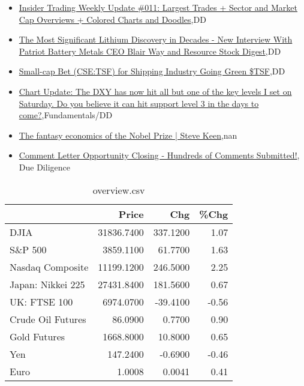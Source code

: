 \documentclass{article}%
\begin{document}
%
\begin{itemize}%
\item%
\href{https://reddit.com/r/wallstreetbets/comments/ydxvmz/insider\_trading\_weekly\_update\_011\_largest\_trades/}{Insider Trading Weekly Update \#011: Largest Trades + Sector and Market Cap Overviews + Colored Charts and Doodles},DD%
\item%
\href{https://reddit.com/r/Baystreetbets/comments/yducwl/the\_most\_significant\_lithium\_discovery\_in\_decades/}{The Most Significant Lithium Discovery in Decades - New Interview With Patriot Battery Metals CEO Blair Way and Resource Stock Digest},DD%
\item%
\href{https://reddit.com/r/Baystreetbets/comments/yd7ajq/smallcap\_bet\_csetsf\_for\_shipping\_industry\_going/}{Small-cap Bet (CSE:TSF) for Shipping Industry Going Green \$TSF},DD%
\item%
\href{https://reddit.com/r/StockMarket/comments/ydxb5z/chart\_update\_the\_dxy\_has\_now\_hit\_all\_but\_one\_of/}{Chart Update: The DXY has now hit all but one of the key levels I set on Saturday. Do you believe it can hit support level 3 in the days to come?},Fundamentals/DD%
\item%
\href{https://reddit.com/r/Economics/comments/ydu8n4/the\_fantasy\_economics\_of\_the\_nobel\_prize\_steve/}{The fantasy economics of the Nobel Prize | Steve Keen},nan%
\item%
\href{https://reddit.com/r/Superstonk/comments/ydxvkl/comment\_letter\_opportunity\_closing\_hundreds\_of/}{Comment Letter Opportunity Closing - Hundreds of Comments Submitted!}, Due Diligence%
\end{itemize}%


\begin{table}[htbp]%
\caption{overview.csv}%
\centering%
\begin{adjustbox}{width=1\textwidth}%
\begin{tabular}{lrrr}
\toprule
                  &      Price &      Chg &  \%Chg \\
\midrule
             DJIA & 31836.7400 & 337.1200 &  1.07 \\
          S\&P 500 &  3859.1100 &  61.7700 &  1.63 \\
 Nasdaq Composite & 11199.1200 & 246.5000 &  2.25 \\
Japan: Nikkei 225 & 27431.8400 & 181.5600 &  0.67 \\
     UK: FTSE 100 &  6974.0700 & -39.4100 & -0.56 \\
Crude Oil Futures &    86.0900 &   0.7700 &  0.90 \\
     Gold Futures &  1668.8000 &  10.8000 &  0.65 \\
              Yen &   147.2400 &  -0.6900 & -0.46 \\
             Euro &     1.0008 &   0.0041 &  0.41 \\
\bottomrule
\end{tabular}
%
\end{adjustbox}%
\end{table}
\end{document}
